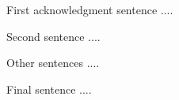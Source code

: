 \begin{agradecimentos}
    First acknowledgment sentence ....

    Second sentence ....

    Other sentences ....

    Final sentence ....

\end{agradecimentos}
